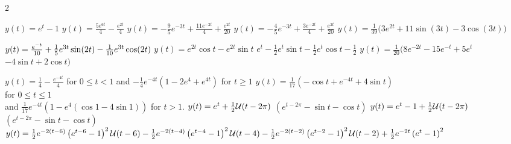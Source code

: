 \begin{multicols}{2}
	\scriptsize
	\begin{Answer}[ref={EX72}]
		\Question 
		\begin{tasks}
			
			\task $y(t) = e^t-1$ 
			\task $y(t)= \frac{5 e^{6 t}}{4}-\frac{e^{2 t}}{4}$
			\task $y(t) =-\frac{9}{5} e^{-3 t}+\frac{11 e^{-2 t}}{4}+\frac{e^{2 t}}{20}$
			\task $y(t) =-\frac{4}{5} e^{-3 t}+\frac{3 e^{-2 t}}{4}+\frac{e^{2 t}}{20}$
		 	\task \(y(t) = \frac{1}{39} \big(3 e^{2 t}
		 					+ 11 \sin (3 t)-3 \cos (3 t)\big)\)
		
	
		
		\end{tasks} 
		\Question 
		\begin{tasks}[resume=false]
			\task $y(t)=\frac{e^{-t}}{10}+\frac{1}{5} e^{3 t} \sin (2 t)\\-\frac{1}{10} e^{3 t} \cos (2 t)$
			\task $y(t)= e^{2 t} \cos t-e^{2 t} \sin t$
			\task $e^t-\frac{1}{2} e^t \sin t-\frac{1}{2} e^t \cos t-\frac{1}{2}$
			\task \(y(t)=\frac{1}{20} \big(8 e^{-2 t}
			-15 e^{-t}+5 e^t\)\\\(-4 \sin t+2 \cos t\big)\)
		\end{tasks} 
		
		\Question 
		\begin{tasks}[resume=false]
		\task $ y(t)=
			\frac{1}{4}-\frac{e^{-4 t}}{4}$ for $ 0\leq t< 1$ and 
			$-\frac{1}{4} e^{-4 t} \left(1-2 e^4+e^{4 t}\right)$ for $t\ge 1$
		\task $y(t)=\frac{1}{17} \left(-\cos t+e^{-4 t}+4 \sin t\right)$\\ for $0\le t \le 1$\\ and $\frac{1}{17} e^{-4 t} \left(1-e^4 (\cos 1-4 \sin 1)\right)$ for   $t>1.$ 
		\task \(y(t) =e^t\\+\frac{1}{2} \mathcal{U}(t-2 \pi )\) \(\left(e^{t-2 \pi }-\sin t-\cos t\right)\)
		\task \(y(t)=e^t-1\\+\frac{1}{2} \mathcal{U}(t-2 \pi)\) \(\left(e^{t-2 \pi }-\sin t-\cos t\right)\)
		\task\(y(t) = \frac{1}{2} e^{-2 (t-6)} \left(e^{t-6}-1\right)^2 \mathcal{U}(t-6)\\-\frac{1}{2} e^{-2 (t-4)} \left(e^{t-4}-1\right)^2 \mathcal{U}(t-4)\\-\frac{1}{2} e^{-2 (t-2)} \left(e^{t-2}-1\right)^2 \mathcal{U} (t-2)\\+\frac{1}{2} e^{-2 t} \left(e^t-1\right)^2\)
	

\end{tasks}
\end{Answer}
\end{multicols}
